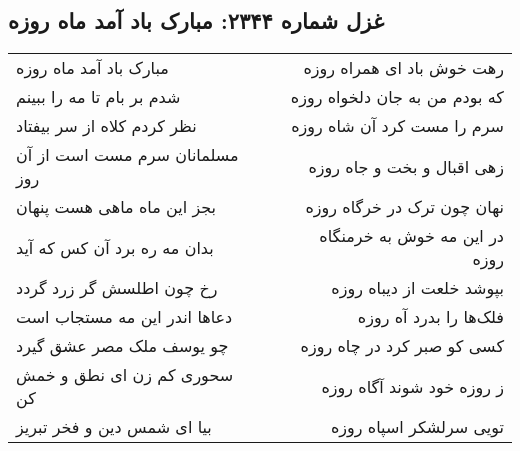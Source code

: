 \begin{center}
\section*{غزل شماره ۲۳۴۴: مبارک باد آمد ماه روزه}
\label{sec:2344}
\begin{longtable}{l p{0.5cm} r}
مبارک باد آمد ماه روزه
&&
رهت خوش باد ای همراه روزه
\\
شدم بر بام تا مه را ببینم
&&
که بودم من به جان دلخواه روزه
\\
نظر کردم کلاه از سر بیفتاد
&&
سرم را مست کرد آن شاه روزه
\\
مسلمانان سرم مست است از آن روز
&&
زهی اقبال و بخت و جاه روزه
\\
بجز این ماه ماهی هست پنهان
&&
نهان چون ترک در خرگاه روزه
\\
بدان مه ره برد آن کس که آید
&&
در این مه خوش به خرمنگاه روزه
\\
رخ چون اطلسش گر زرد گردد
&&
بپوشد خلعت از دیباه روزه
\\
دعاها اندر این مه مستجاب است
&&
فلک‌ها را بدرد آه روزه
\\
چو یوسف ملک مصر عشق گیرد
&&
کسی کو صبر کرد در چاه روزه
\\
سحوری کم زن ای نطق و خمش کن
&&
ز روزه خود شوند آگاه روزه
\\
بیا ای شمس دین و فخر تبریز
&&
تویی سرلشکر اسپاه روزه
\\
\end{longtable}
\end{center}
